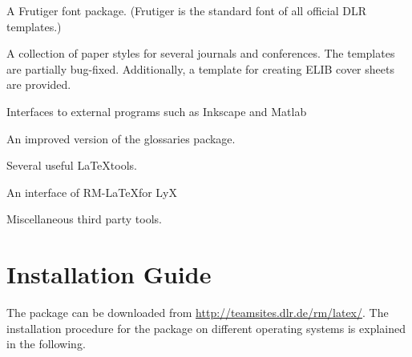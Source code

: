 \documentclass{scrartcl}
\begin{document}
A Frutiger font package. (Frutiger is the standard font of all official DLR templates.)

A collection of paper styles for several journals and conferences. The templates are partially bug-fixed. Additionally, a template for creating ELIB cover sheets are provided.

Interfaces to external programs such as Inkscape and Matlab

An improved version of the glossaries package.

Several useful \LaTeX tools.

An interface of RM-\LaTeX for LyX

Miscellaneous third party tools.

%
\section{Installation Guide}
The \rmlatex package can be downloaded from \url{http://teamsites.dlr.de/rm/latex/}. The installation procedure for the \rmlatex package on different operating systems is explained in the following.

%
%
\end{document}
